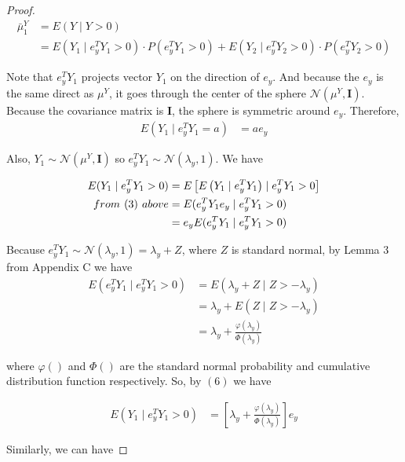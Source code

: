 \documentclass[12pt]{article}
\begin{document}
\begin{proof}
\begin{align}
\bar{\mu}^Y_1 & = E(Y \mid Y>0) \\
 &= E(Y_1 \mid e^T_y Y_1 > 0) \cdot P(e^T_y Y_1 >0) +E(Y_2 \mid e^T_y Y_2 > 0) \cdot P(e^T_y Y_2 >0)
\end{align}

Note that $e^T_y Y_1$ projects vector $Y_1$ on the direction of $e_y$. And because the $e_y$ is the same direct as $\mu^Y$, it goes through the center of the sphere $\mathcal{N}\left( \mu^Y, \mathbf{I}\right)$. Because the covariance matrix is $\mathbf{I}$, the sphere is symmetric around $e_y$. Therefore, 
\begin{align}
E(Y_1 \mid e^T_y Y_1 = a ) & = a e_y
\end{align}

Also, $Y_1 \sim \mathcal{N}\left( \mu^Y, \mathbf{I}\right)$ so $e^T_y Y_1 \sim \mathcal{N}\left( \lambda_y, 1\right)$. We have

\begin{align}
E(Y_1 \mid e^T_y Y_1 > 0)  & = E \left[  E\left(  Y_1 \mid e^T_y Y_1  \right) \mid e^T_y Y_1 > 0  \right] \\
 from \hspace{0.05in} (3) \hspace{0.05in} above	& =  E( e^T_y Y_1 e_y  \mid e^T_y Y_1 > 0  )  \\ 
	& = e_y E( e^T_y Y_1 \mid e^T_y Y_1 > 0  ) 
\end{align}

Because $e^T_y Y_1 \sim \mathcal{N}\left( \lambda_y, 1\right)  = \lambda_y + Z$, where $Z$ is standard normal, by Lemma $3$ from Appendix C we have 
\begin{align}
E( e^T_y Y_1 \mid e^T_y Y_1 > 0  ) &= E(\lambda_y +  Z \mid Z > -  \lambda_y )  \\
 &= \lambda_y + E(Z \mid Z > -  \lambda_y ) \\
 &= \lambda_y + \frac{\varphi(\lambda_y)}{\Phi(\lambda_y)}
\end{align}

 where $\varphi()$ and $\Phi()$ are the standard normal probability and cumulative distribution function respectively. So, by $(6)$ we have

\begin{align}
E(Y_1 \mid e^T_y Y_1 > 0)  &= \left[ \lambda_y + \frac{\varphi(\lambda_y)}{\Phi(\lambda_y)}  \right] e_y
\end{align}

Similarly, we can have


\end{proof}
\end{document}
